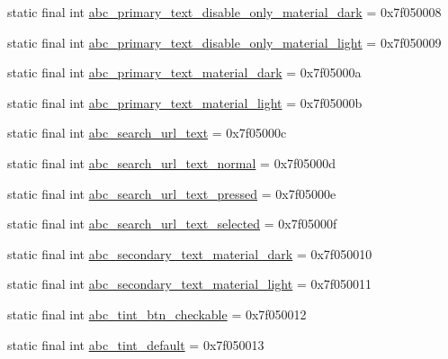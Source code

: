 \begin{DoxyCompactItemize}
\item 
static final int \mbox{\hyperlink{classandroid_1_1support_1_1design_1_1R_1_1color_ad8fbdd5eadbb720a1389509088e6feeb}{abc\+\_\+primary\+\_\+text\+\_\+disable\+\_\+only\+\_\+material\+\_\+dark}} = 0x7f050008
\item 
static final int \mbox{\hyperlink{classandroid_1_1support_1_1design_1_1R_1_1color_af8d659099cf3581184ff12bdce846923}{abc\+\_\+primary\+\_\+text\+\_\+disable\+\_\+only\+\_\+material\+\_\+light}} = 0x7f050009
\item 
static final int \mbox{\hyperlink{classandroid_1_1support_1_1design_1_1R_1_1color_abf3fbbe88ae6ba424d9b0915a5f0662e}{abc\+\_\+primary\+\_\+text\+\_\+material\+\_\+dark}} = 0x7f05000a
\item 
static final int \mbox{\hyperlink{classandroid_1_1support_1_1design_1_1R_1_1color_af0a900585141c4a06c785d1e7bc76dfc}{abc\+\_\+primary\+\_\+text\+\_\+material\+\_\+light}} = 0x7f05000b
\item 
static final int \mbox{\hyperlink{classandroid_1_1support_1_1design_1_1R_1_1color_ac5d88b97d844e9ace9a23ae0dbdb037b}{abc\+\_\+search\+\_\+url\+\_\+text}} = 0x7f05000c
\item 
static final int \mbox{\hyperlink{classandroid_1_1support_1_1design_1_1R_1_1color_a7b1b92788292df899b6bfade9ee1873f}{abc\+\_\+search\+\_\+url\+\_\+text\+\_\+normal}} = 0x7f05000d
\item 
static final int \mbox{\hyperlink{classandroid_1_1support_1_1design_1_1R_1_1color_abc80cc030a45eda4a7aef21b3398df79}{abc\+\_\+search\+\_\+url\+\_\+text\+\_\+pressed}} = 0x7f05000e
\item 
static final int \mbox{\hyperlink{classandroid_1_1support_1_1design_1_1R_1_1color_a4032de7cc519a94dd916e96bb2d06d47}{abc\+\_\+search\+\_\+url\+\_\+text\+\_\+selected}} = 0x7f05000f
\item 
static final int \mbox{\hyperlink{classandroid_1_1support_1_1design_1_1R_1_1color_a470b107e13bb6ec13e105785727842b4}{abc\+\_\+secondary\+\_\+text\+\_\+material\+\_\+dark}} = 0x7f050010
\item 
static final int \mbox{\hyperlink{classandroid_1_1support_1_1design_1_1R_1_1color_a5914b399b4295c431feb610f22a77aa6}{abc\+\_\+secondary\+\_\+text\+\_\+material\+\_\+light}} = 0x7f050011
\item 
static final int \mbox{\hyperlink{classandroid_1_1support_1_1design_1_1R_1_1color_a99de59d6f2ef5f4dab91077916321a05}{abc\+\_\+tint\+\_\+btn\+\_\+checkable}} = 0x7f050012
\item 
static final int \mbox{\hyperlink{classandroid_1_1support_1_1design_1_1R_1_1color_a0ed58f69d054179abf3ab6af3c296dab}{abc\+\_\+tint\+\_\+default}} = 0x7f050013

\end{DoxyCompactItemize}
